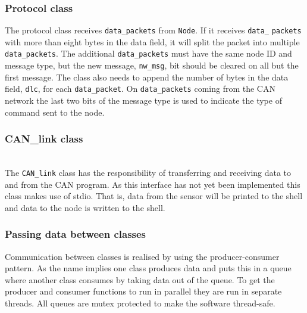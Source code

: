 \subsubsection*{Protocol class}

The protocol class receives \texttt{data\_packets} from \texttt{Node}. 
If it receives \texttt{data\_} \texttt{packets} with more than eight bytes in the data field, it will split the packet into multiple \texttt{data\_packets}.
The additional \texttt{data\_packets} must have the same node ID and message type, but the new message, \texttt{nw\_msg}, bit should be cleared on all but the first message.
The class also needs to append the number of bytes in the data field, \texttt{dlc}, for each \texttt{data\_packet}.
On \texttt{data\_packets} coming from the CAN network the last two bits of the message type is used to indicate the type of command sent to the node.

\subsubsection*{CAN\_link class} ~ \\
The \texttt{CAN\_link} class has the responsibility of transferring and receiving data to and from the CAN program.
As this interface has not yet been implemented this class makes use of stdio. 
That is, data from the sensor will be printed to the shell and data to the node is written to the shell. 
\subsubsection*{Passing data between classes}
Communication between classes is realised by using the producer-consumer pattern.
As the name implies one class produces data and puts this in a queue where another class consumes by taking data out of the queue.
To get the producer and consumer functions to run in parallel they are run in separate threads.
All queues are mutex protected to make the software thread-safe.

